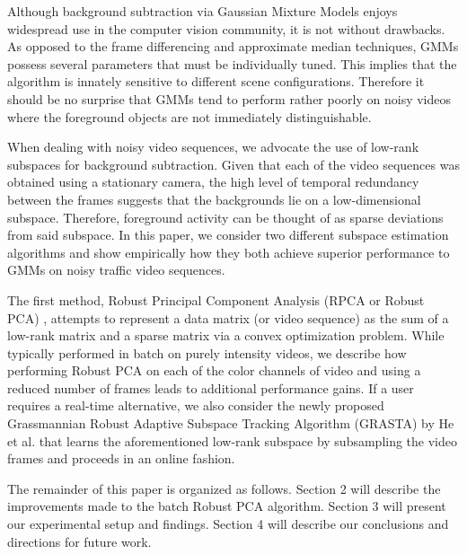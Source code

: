 \documentclass{article}
\begin{document}
Although background subtraction via Gaussian Mixture Models enjoys widespread use in the computer vision community, it is not without drawbacks. As opposed to the frame differencing and approximate median techniques, GMMs possess several parameters that must be individually tuned. This implies that the algorithm is innately sensitive to different scene configurations. Therefore it should be no surprise that GMMs tend to perform rather poorly on noisy videos where the foreground objects are not immediately distinguishable. 

When dealing with noisy video sequences, we advocate the use of low-rank subspaces for background subtraction.  Given that each of the video sequences was obtained using a stationary camera, the high level of temporal redundancy between the frames suggests that the backgrounds lie on a low-dimensional subspace. Therefore, foreground activity can be thought of as sparse deviations from said subspace. In this paper, we consider two different subspace estimation algorithms and show empirically how they both achieve superior performance to GMMs on noisy traffic video sequences. 

The first method,  Robust Principal Component Analysis (RPCA or Robust PCA) \cite{RPCA09}, attempts to represent a data matrix (or video sequence) as the sum of a low-rank matrix and a sparse matrix via a convex optimization problem. While typically performed in batch on purely intensity videos, we describe how performing Robust PCA on each of the color channels of video and using a reduced number of frames leads to additional performance gains. If a user requires a real-time alternative, we also consider the newly proposed Grassmannian Robust Adaptive Subspace Tracking Algorithm (GRASTA) by He et al. \cite{GRASTA12} that learns the aforementioned low-rank subspace by subsampling the video frames and proceeds in an online fashion. 

The remainder of this paper is organized as follows. Section 2 will describe the improvements made to the batch Robust PCA algorithm. Section 3 will present our experimental setup and findings. Section 4 will describe our conclusions and directions for future work.


\end{document}
